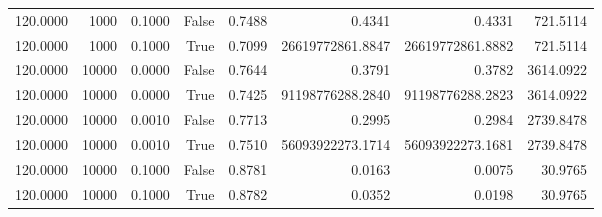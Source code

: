 \begin{table}
\begin{tabular}{rrrrrrrr}
120.0000 & 1000 & 0.1000 & False & 0.7488 & 0.4341 & 0.4331 & 721.5114 \\
120.0000 & 1000 & 0.1000 & True & 0.7099 & 26619772861.8847 & 26619772861.8882 & 721.5114 \\
120.0000 & 10000 & 0.0000 & False & 0.7644 & 0.3791 & 0.3782 & 3614.0922 \\
120.0000 & 10000 & 0.0000 & True & 0.7425 & 91198776288.2840 & 91198776288.2823 & 3614.0922 \\
120.0000 & 10000 & 0.0010 & False & 0.7713 & 0.2995 & 0.2984 & 2739.8478 \\
120.0000 & 10000 & 0.0010 & True & 0.7510 & 56093922273.1714 & 56093922273.1681 & 2739.8478 \\
120.0000 & 10000 & 0.1000 & False & 0.8781 & 0.0163 & 0.0075 & 30.9765 \\
120.0000 & 10000 & 0.1000 & True & 0.8782 & 0.0352 & 0.0198 & 30.9765 \\
\bottomrule
\end{tabular}
\end{table}
